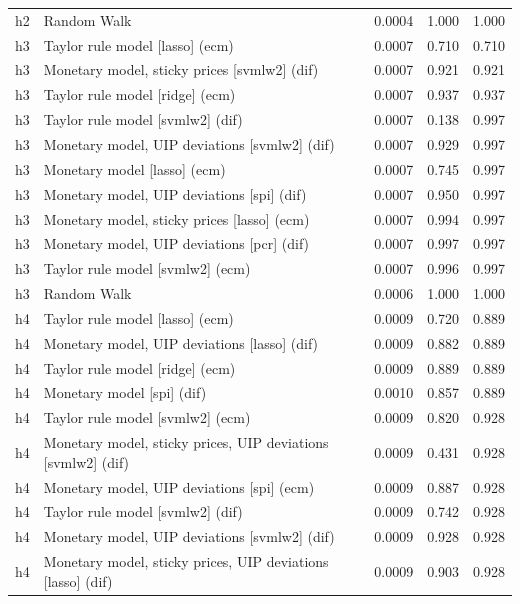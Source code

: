 \begin{ThreePartTable}
\begin{longtable}[t]{cp{5.5cm}ccc}
h2 & \raggedright Random Walk & 0.0004 & 1.000 & 1.000\\
\addlinespace
h3 & \raggedright Taylor rule model [lasso] (ecm) & 0.0007 & 0.710 & 0.710\\
h3 & \raggedright Monetary model, sticky prices [svmlw2] (dif) & 0.0007 & 0.921 & 0.921\\
h3 & \raggedright Taylor rule model [ridge] (ecm) & 0.0007 & 0.937 & 0.937\\
h3 & \raggedright Taylor rule model [svmlw2] (dif) & 0.0007 & 0.138 & 0.997\\
h3 & \raggedright Monetary model, UIP deviations [svmlw2] (dif) & 0.0007 & 0.929 & 0.997\\
h3 & \raggedright Monetary model [lasso] (ecm) & 0.0007 & 0.745 & 0.997\\
h3 & \raggedright Monetary model, UIP deviations [spi] (dif) & 0.0007 & 0.950 & 0.997\\
h3 & \raggedright Monetary model, sticky prices [lasso] (ecm) & 0.0007 & 0.994 & 0.997\\
h3 & \raggedright Monetary model, UIP deviations [pcr] (dif) & 0.0007 & 0.997 & 0.997\\
h3 & \raggedright Taylor rule model [svmlw2] (ecm) & 0.0007 & 0.996 & 0.997\\
h3 & \raggedright Random Walk & 0.0006 & 1.000 & 1.000\\
\addlinespace
h4 & \raggedright Taylor rule model [lasso] (ecm) & 0.0009 & 0.720 & 0.889\\
h4 & \raggedright Monetary model, UIP deviations [lasso] (dif) & 0.0009 & 0.882 & 0.889\\
h4 & \raggedright Taylor rule model [ridge] (ecm) & 0.0009 & 0.889 & 0.889\\
h4 & \raggedright Monetary model [spi] (dif) & 0.0010 & 0.857 & 0.889\\
h4 & \raggedright Taylor rule model [svmlw2] (ecm) & 0.0009 & 0.820 & 0.928\\
h4 & \raggedright Monetary model, sticky prices, UIP deviations [svmlw2] (dif) & 0.0009 & 0.431 & 0.928\\
h4 & \raggedright Monetary model, UIP deviations [spi] (ecm) & 0.0009 & 0.887 & 0.928\\
h4 & \raggedright Taylor rule model [svmlw2] (dif) & 0.0009 & 0.742 & 0.928\\
h4 & \raggedright Monetary model, UIP deviations [svmlw2] (dif) & 0.0009 & 0.928 & 0.928\\
h4 & \raggedright Monetary model, sticky prices, UIP deviations [lasso] (dif) & 0.0009 & 0.903 & 0.928\\

\end{longtable}
\end{ThreePartTable}
